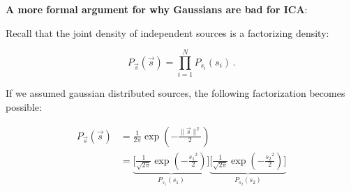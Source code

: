 

\begin{frame}
\newpage
\textbf{A more formal argument for why Gaussians are bad for ICA}:

Recall that the joint density of independent sources is a factorizing density:

\begin{equation}
\label{eq:facts}
P_{\vec s}(\vec s) = \prod_{i=1}^{N} P_{s_i}(s_i)  \,.
\end{equation}

If we assumed gaussian distributed sources, the following factorization becomes possible:

\begin{equation}
	\label{eq:factsgauss}
	\begin{array}{ll}
	P_{\vec{s}}({\vec{s}}) 
	& = \frac{1}{2\pi} 
    \exp \left( -\frac{\lVert{\vec{s}}\rVert^2}{2} \right)
	\\
	& = \underbrace{
	\Bigg[ \frac{1}{\sqrt{2\pi}} \exp \left( -
		\frac{{s_1}^2}{2} \right) \Bigg]
		}_{{P}_{s_1}({s}_1)}
		\underbrace{\Bigg[
			\frac{1}{\sqrt{2\pi}} \exp \left( -
			\frac{{s_2}^2}{2} \right)
		\Bigg]
			}_{{P}_{s_2}({s}_2)}
	\end{array}
\end{equation}
\end{frame}

